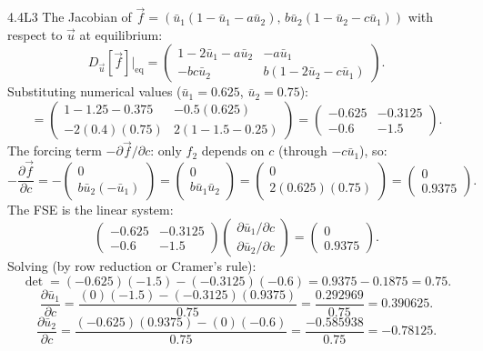 \begin{solution}{4.4}{L3}
The Jacobian of $\vec{f} = (\bar{u}_1(1-\bar{u}_1-a\bar{u}_2),\,
b\bar{u}_2(1-\bar{u}_2-c\bar{u}_1))$ with respect to $\vec{u}$
at equilibrium:
\[
  D_{\vec{u}}[\vec{f}]\big|_{\text{eq}}
  = \begin{pmatrix}
      1-2\bar{u}_1-a\bar{u}_2 & -a\bar{u}_1 \\
      -bc\bar{u}_2 & b(1-2\bar{u}_2-c\bar{u}_1)
    \end{pmatrix}.
\]
Substituting numerical values ($\bar{u}_1=0.625$, $\bar{u}_2=0.75$):
\[
  = \begin{pmatrix}
      1-1.25-0.375 & -0.5(0.625) \\
      -2(0.4)(0.75) & 2(1-1.5-0.25)
    \end{pmatrix}
  = \begin{pmatrix}
      -0.625 & -0.3125 \\
      -0.6 & -1.5
    \end{pmatrix}.
\]
The forcing term $-\partial\vec{f}/\partial c$: only $f_2$ depends
on $c$ (through $-c\bar{u}_1$), so:
\[
  -\frac{\partial\vec{f}}{\partial c}
  = -\begin{pmatrix} 0 \\ b\bar{u}_2(-\bar{u}_1) \end{pmatrix}
  = \begin{pmatrix} 0 \\ b\bar{u}_1\bar{u}_2 \end{pmatrix}
  = \begin{pmatrix} 0 \\ 2(0.625)(0.75) \end{pmatrix}
  = \begin{pmatrix} 0 \\ 0.9375 \end{pmatrix}.
\]
The FSE is the linear system:
\[
  \begin{pmatrix} -0.625 & -0.3125 \\ -0.6 & -1.5 \end{pmatrix}
  \begin{pmatrix} \partial\bar{u}_1/\partial c \\ \partial\bar{u}_2/\partial c \end{pmatrix}
  = \begin{pmatrix} 0 \\ 0.9375 \end{pmatrix}.
\]
Solving (by row reduction or Cramer's rule):
\[
  \det = (-0.625)(-1.5) - (-0.3125)(-0.6) = 0.9375 - 0.1875 = 0.75.
\]
\[
  \frac{\partial\bar{u}_1}{\partial c}
  = \frac{(0)(-1.5) - (-0.3125)(0.9375)}{0.75}
  = \frac{0.292969}{0.75} = 0.390625.
\]
\[
  \frac{\partial\bar{u}_2}{\partial c}
  = \frac{(-0.625)(0.9375) - (0)(-0.6)}{0.75}
  = \frac{-0.585938}{0.75} = -0.78125.
\]


\end{solution}
